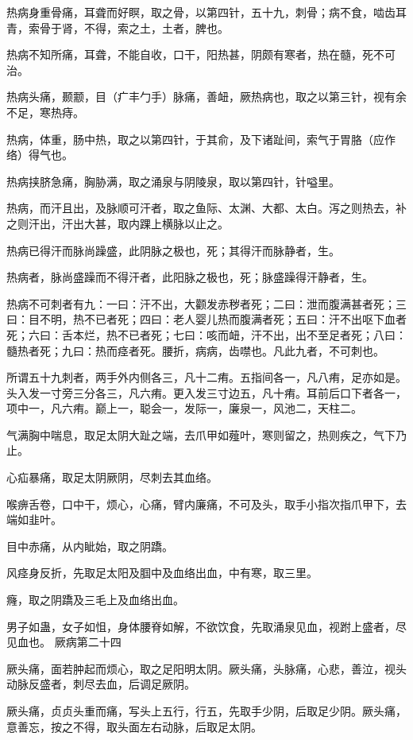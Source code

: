 \documentclass[a4paper,12pt,UTF8,twoside]{ctexbook}
\begin{document}
	热病身重骨痛，耳聋而好瞑，取之骨，以第四针，五十九，刺骨；病不食，啮齿耳青，索骨于肾，不得，索之土，土者，脾也。
	
	热病不知所痛，耳聋，不能自收，口干，阳热甚，阴颇有寒者，热在髓，死不可治。
	
	热病头痛，颞颥，目（疒丰勹手）脉痛，善衄，厥热病也，取之以第三针，视有余不足，寒热痔。
	
	热病，体重，肠中热，取之以第四针，于其俞，及下诸趾间，索气于胃胳（应作络）得气也。
	
	热病挟脐急痛，胸胁满，取之涌泉与阴陵泉，取以第四针，针嗌里。
	
	热病，而汗且出，及脉顺可汗者，取之鱼际、太渊、大都、太白。泻之则热去，补之则汗出，汗出大甚，取内踝上横脉以止之。
	
	热病已得汗而脉尚躁盛，此阴脉之极也，死；其得汗而脉静者，生。
	
	热病者，脉尚盛躁而不得汗者，此阳脉之极也，死；脉盛躁得汗静者，生。
	
	热病不可刺者有九：一曰：汗不出，大颧发赤秽者死；二曰：泄而腹满甚者死；三曰：目不明，热不已者死；四曰：老人婴儿热而腹满者死；五曰：汗不出呕下血者死；六曰：舌本烂，热不已者死；七曰：咳而衄，汗不出，出不至足者死；八曰：髓热者死；九曰：热而痉者死。腰折，病病，齿噤也。凡此九者，不可刺也。
	
	所谓五十九刺者，两手外内侧各三，凡十二痏。五指间各一，凡八痏，足亦如是。头入发一寸旁三分各三，凡六痏。更入发三寸边五，凡十痏。耳前后口下者各一，项中一，凡六痏。巅上一，聪会一，发际一，廉泉一，风池二，天柱二。
	
	气满胸中喘息，取足太阴大趾之端，去爪甲如薤叶，寒则留之，热则疾之，气下乃止。
	
	心疝暴痛，取足太阴厥阴，尽刺去其血络。
	
	喉痹舌卷，口中干，烦心，心痛，臂内廉痛，不可及头，取手小指次指爪甲下，去端如韭叶。
	
	目中赤痛，从内眦始，取之阴蹻。
	
	风痉身反折，先取足太阳及腘中及血络出血，中有寒，取三里。
	
	癃，取之阴蹻及三毛上及血络出血。
	
	男子如蛊，女子如怚，身体腰脊如解，不欲饮食，先取涌泉见血，视跗上盛者，尽见血也。
	厥病第二十四
	
	厥头痛，面若肿起而烦心，取之足阳明太阴。厥头痛，头脉痛，心悲，善泣，视头动脉反盛者，刺尽去血，后调足厥阴。
	
	厥头痛，贞贞头重而痛，写头上五行，行五，先取手少阴，后取足少阴。厥头痛，意善忘，按之不得，取头面左右动脉，后取足太阴。
	
\end{document}
